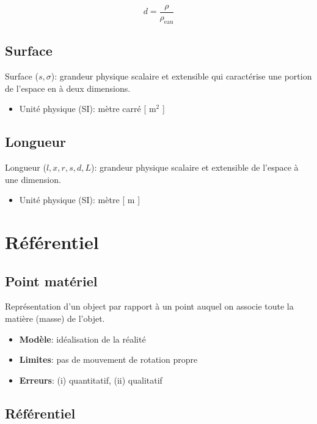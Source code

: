 \documentclass[
    11pt,
    a4paper,
    oneside,
    headinlcude, footinclude,
    twoside,
]{report}
\begin{document}
\begin{equation}
d = \frac{\rho}{\rho_{ \textrm{eau} }}
\end{equation}

\subsection{Surface}
\label{sub:surface}

Surface ($s, \sigma$): grandeur physique scalaire et extensible qui
caractérise une portion de l'espace en à deux dimensions.

\begin{itemize}
\item Unité physique (SI): mètre carré [ m$^{2}$ ]
\end{itemize}

\subsection{Longueur}
\label{sub:longueur}

Longueur ($l, x, r, s, d, L$): grandeur physique scalaire et extensible de
l'espace à une dimension.

\begin{itemize}
\item Unité physique (SI): mètre [ m ]
\end{itemize}


\section{Référentiel}
\label{sec:referentiel}

\subsection{Point matériel}
\label{sub:point_materiel}

Représentation  d'un object par rapport à un point auquel on associe toute la
matière (masse) de l'objet.

\begin{itemize}
\item \textbf{Modèle}: idéalisation de la réalité
\item \textbf{Limites}: pas de mouvement de rotation propre
\item \textbf{Erreurs}: (i) quantitatif, (ii) qualitatif
\end{itemize}

\subsection{Référentiel}
\label{sub:referentiel}
\end{document}
